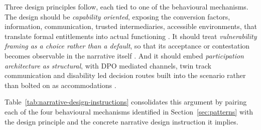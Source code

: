 \documentclass[12pt,a4paper]{report}
\begin{document}
Three design principles follow, each tied to one of the behavioural mechanisms. The design should be \emph{capability oriented}, exposing the conversion factors, information, communication, trusted intermediaries, accessible environments, that translate formal entitlements into actual functioning \cite{sen_1999_development,ton2021agency,villeneuve2021pcep}. It should treat \emph{vulnerability framing as a choice rather than a default}, so that its acceptance or contestation becomes observable in the narrative itself \cite{stjernholm2025critical,jost_2003_decade,setijaningrum2024tokenism}. And it should embed \emph{participation architecture as structural}, with DPO mediated channels, twin track communication and disability led decision routes built into the scenario rather than bolted on as accommodations \cite{pertiwi2019dpo,villeneuve2017dpo,craig2023twintrack,rahatiningtyas2025yogyakarta}.

Table~\ref{tab:narrative-design-instructions} consolidates this argument by pairing each of the four behavioural mechanisms identified in Section~\ref{sec:patterns} with the design principle and the concrete narrative design instruction it implies.
\end{document}
